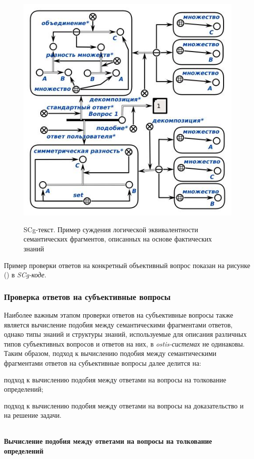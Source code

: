 \begin{figure}[H]
	\caption{SCg-текст. Пример суждения логической эквивалентности семантических фрагментов, описанных на основе фактических знаний}
	\includegraphics[scale=0.7]{author/part7/figures/logical_equivalence_example.jpg}
	\label{fig:LE_example}
\end{figure}

Пример проверки ответов на конкретный объективный вопрос показан на рисунке (\textit{}) в \textit{SCg-коде}.

\subsubsection{Проверка ответов на субъективные вопросы}
\label{subsubsec_checking_answers_subjective_questions}

Наиболее важным этапом проверки ответов на субъективные вопросы также является вычисление подобия между семантическими фрагментами ответов, однако типы знаний и структуры знаний, используемые для описания различных типов субъективных вопросов и ответов на них, в \textit{ostis-системах} не одинаковы. Таким образом, подход к вычислению подобия между семантическими фрагментами ответов на субъективные вопросы далее делится на:

\begin{textitemize}
	\item подход к вычислению подобия между ответами на вопросы на толкование определений;
	\item подход к вычислению подобия между ответами на вопросы на доказательство и на решение задачи.
\end{textitemize} 
~\\
\textbf{Вычисление подобия между ответами на вопросы на толкование определений} 

